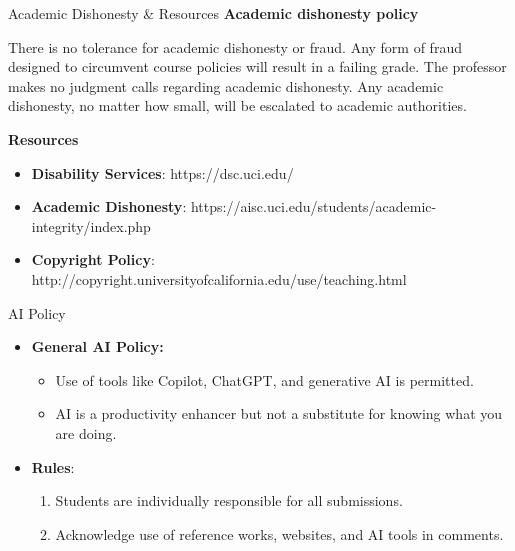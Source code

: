 \documentclass[aspectratio=169]{beamer}
\begin{document}
\begin{frame}{Academic Dishonesty \& Resources }
\textbf{Academic dishonesty policy}

There is no tolerance for academic dishonesty or fraud. Any form of fraud designed to circumvent course policies will result in a failing grade. The professor makes no judgment calls regarding academic dishonesty. Any academic dishonesty, no matter how small, will be escalated to academic authorities.

\textbf{Resources}
\begin{itemize}
\item
\textbf{Disability Services}: {https://dsc.uci.edu/}{}
\item
\textbf{Academic Dishonesty}: {https://aisc.uci.edu/students/academic-integrity/index.php}{}
\item
\textbf{Copyright Policy}: {http://copyright.universityofcalifornia.edu/use/teaching.html}{}
\end{itemize}
\end{frame}

\begin{frame}{AI Policy}
\begin{itemize}[<+->]
    \item[]
    \textbf{General AI Policy:}
\begin{itemize}[<+->]
    \item Use of tools like Copilot, ChatGPT, and generative AI is permitted.
    \item AI is a productivity enhancer but not a substitute for knowing what you are doing.
\end{itemize}
\item[]\textbf{Rules}:
\begin{enumerate}[<+->]
    \item Students are individually responsible for all submissions.
    \item Acknowledge use of reference works, websites, and AI tools in comments.
\end{enumerate}
\end{itemize}
\end{frame}

\maketitle
\end{document}
